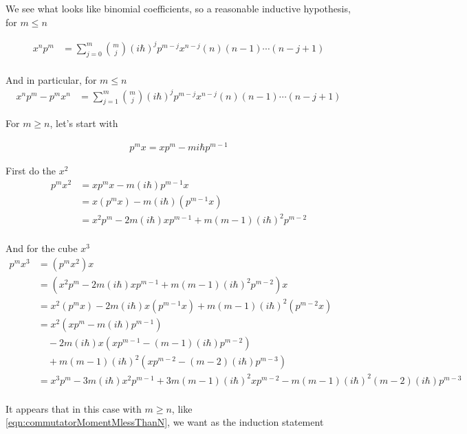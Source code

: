 \documentclass{article}
\begin{document}
We see what looks like binomial coefficients, so a reasonable inductive hypothesis, for $m \le n$

\begin{align}\label{eqn:commutatorMomentMlessThanN}
x^n p^m
&= \sum_{j=0}^m \binom{m}{j} (i \hbar)^j p^{m-j} x^{n-j} (n)(n-1)\cdots(n-j+1) \\
\end{align}

And in particular, for $m \le n$
\begin{align}
x^n p^m - p^m x^n
&= \sum_{j=1}^m \binom{m}{j} (i \hbar)^j p^{m-j} x^{n-j} (n)(n-1)\cdots(n-j+1) 
\end{align}

For $m \ge n$, let's start with

\begin{align*}
p^m x = x p^m -  m i \hbar p^{m-1} 
\end{align*}

First do the $x^2$
\begin{align*}
p^m x^2 
&= x p^m x -  m (i \hbar) p^{m-1} x \\
&= x (p^m x) -  m (i \hbar) (p^{m-1} x) \\
&= x^2 p^m - 2 m (i \hbar) x p^{m-1} +  m (m-1)(i \hbar)^2 p^{m-2} \\
\end{align*}

And for the cube $x^3$
\begin{align*}
p^m x^3  
&= 
( p^m x^2 ) x \\
&= 
( x^2 p^m - 2 m (i \hbar) x p^{m-1} +  m (m-1)(i \hbar)^2 p^{m-2} ) x \\
&= 
x^2 (p^m x )
- 2 m (i \hbar) x (p^{m-1} x )
+ m (m-1)(i \hbar)^2 (p^{m-2} x) \\
&= 
x^2 ( x p^m -  m (i \hbar) p^{m-1} ) \\
&\quad- 2 m (i \hbar) x ( x p^{m-1} -  (m-1) (i \hbar) p^{m-2} ) \\
&\quad+ m (m-1)(i \hbar)^2 ( x p^{m-2} -  (m-2) (i \hbar) p^{m-3} ) \\
&= 
x^3 p^m 
- 3 m (i \hbar) x^2 p^{m-1} 
+ 3 m (m-1) (i \hbar)^2 x p^{m-2} 
- m (m-1)(i \hbar)^2 (m-2) (i \hbar) p^{m-3} \\
\end{align*}

It appears that in this case with $m \ge n$, like \ref{eqn:commutatorMomentMlessThanN}, we want as the induction statement 
\end{document}
